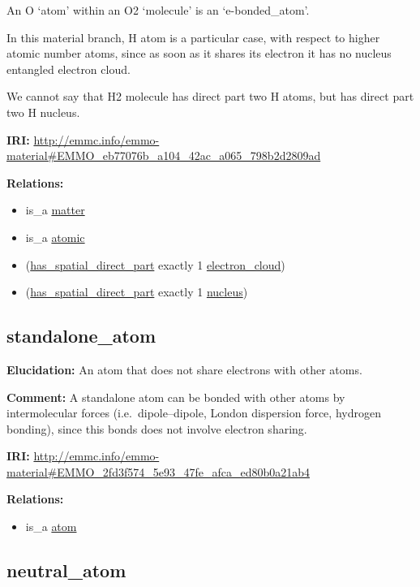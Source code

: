 \documentclass[a4paper,]{report}
\providecommand{\tightlist}{%
  \setlength{\itemsep}{0pt}\setlength{\parskip}{0pt}}
\begin{document}
An O `atom' within an O2 `molecule' is an `e-bonded\_atom'.

In this material branch, H atom is a particular case, with respect to
higher atomic number atoms, since as soon as it shares its electron it
has no nucleus entangled electron cloud.

We cannot say that H2 molecule has direct part two H atoms, but has
direct part two H nucleus.

\textbf{IRI:}
\url{http://emmc.info/emmo-material\#EMMO_eb77076b_a104_42ac_a065_798b2d2809ad}

\textbf{Relations:}

\begin{itemize}
\tightlist
\item
  is\_a \protect\hyperlink{matter}{matter}
\item
  is\_a \protect\hyperlink{atomic}{atomic}
\item
  (\protect\hyperlink{has_spatial_direct_part}{has\_spatial\_direct\_part}
  exactly 1 \protect\hyperlink{electron_cloud}{electron\_cloud})
\item
  (\protect\hyperlink{has_spatial_direct_part}{has\_spatial\_direct\_part}
  exactly 1 \protect\hyperlink{nucleus}{nucleus})
\end{itemize}

\hypertarget{standalone_atom-1}{%
\subsection{standalone\_atom}\label{standalone_atom-1}}

\textbf{Elucidation:} An atom that does not share electrons with other
atoms.

\textbf{Comment:} A standalone atom can be bonded with other atoms by
intermolecular forces (i.e.~dipole--dipole, London dispersion force,
hydrogen bonding), since this bonds does not involve electron sharing.

\textbf{IRI:}
\url{http://emmc.info/emmo-material\#EMMO_2fd3f574_5e93_47fe_afca_ed80b0a21ab4}

\textbf{Relations:}

\begin{itemize}
\tightlist
\item
  is\_a \protect\hyperlink{atom}{atom}
\end{itemize}

\hypertarget{neutral_atom-1}{%
\subsection{neutral\_atom}\label{neutral_atom-1}}
\end{document}
